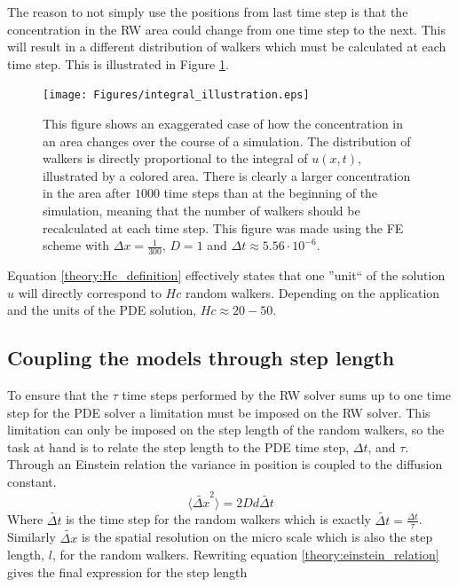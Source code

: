 The reason to not simply use the positions from last time step is that the concentration in the RW area could change from one time step to the next. 
This will result in a different distribution of walkers which must be calculated at each time step. This is illustrated in Figure \ref{theory:concentration_update}.
\begin{figure}[h]
 \centering
 \texttt{[image: Figures/integral\_illustration.eps]}
 \caption[Reason for RW update each time step]{This figure shows an exaggerated case of how the concentration in an area changes over the course of a simulation. The distribution of walkers is directly proportional to the integral of $u(x,t)$, illustrated by a colored area. There is clearly a larger concentration in the area after $1000$ time steps than at the beginning of the simulation, meaning that the number of walkers should be recalculated at each time step. This figure was made using the FE scheme with $\Delta x = \frac{1}{300}$, $D = 1$ and $\Delta t \approx 5.56\cdot 10^{-6}$.}
 \label{theory:concentration_update}
\end{figure}

Equation \eqref{theory:Hc_definition} effectively states that one ''unit`` of the solution $u$ will directly correspond to $Hc$ random walkers. Depending on the application and the units of the PDE solution, $Hc \approx 20-50$.

\subsection{Coupling the models through step length}

To ensure that the $\tau$ time steps performed by the RW solver sums up to one time step for the PDE solver a limitation must be imposed on the RW solver. 
This limitation can only be imposed on the step length of the random walkers, so the task at hand is to relate the step length to the PDE time step, $\Delta t$, and $\tau$. \\
Through an Einstein relation the variance in position is coupled to the diffusion constant.
\begin{equation}\label{theory:einstein_relation}
 \langle\tilde{\Delta x}^2\rangle = 2Dd\tilde{\Delta t}
\end{equation}
Where $\tilde{\Delta t}$ is the time step for the random walkers which is exactly $\tilde{\Delta t} = \frac{\Delta t}{\tau}$. 
Similarly $\tilde{\Delta x}$ is the spatial resolution on the micro scale which is also the step length, $l$, for the random walkers. 
Rewriting equation \eqref{theory:einstein_relation} gives the final expression for the step length

